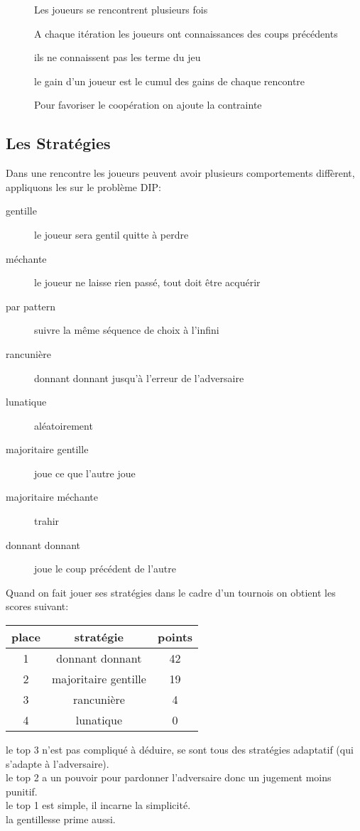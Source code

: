 \begin{description}
\item[] Les joueurs se rencontrent plusieurs fois
\item[] A chaque itération les joueurs ont connaissances des coups précédents 
\item[] ils ne connaissent pas les terme du jeu
\item[] le gain d'un joueur est le cumul des gains de chaque rencontre
\item[] Pour favoriser le coopération on ajoute la contrainte 
\end{description}

\subsection{Les Stratégies}

Dans une rencontre les joueurs peuvent avoir plusieurs comportements diffèrent, appliquons les sur le problème DIP:
\begin{description}
\item[gentille] le joueur sera gentil quitte à perdre
\item[méchante] le joueur ne laisse rien passé, tout doit être acquérir 
\item[par pattern] suivre la même séquence de choix à l'infini
\item[rancunière] donnant donnant jusqu'à l'erreur de l'adversaire
\item[lunatique] aléatoirement
\item[majoritaire gentille] joue ce que l'autre joue
\item[majoritaire méchante] trahir
\item[donnant donnant] joue le coup précédent de l'autre
\end{description}

Quand on fait jouer ses stratégies dans le cadre d'un tournois on obtient les scores suivant:

\begin{tabular}{c|cc}
place & stratégie & points \\
\hline
1 & donnant donnant & 42 \\
2 & majoritaire gentille & 19 \\
3 & rancunière & 4\\
4 & lunatique  & 0\\
\end{tabular}

le top 3 n'est pas compliqué à déduire, se sont tous des stratégies adaptatif (qui s'adapte à l'adversaire).\\
le top 2 a un pouvoir pour pardonner l'adversaire donc un jugement moins punitif.\\
le top 1 est simple, il incarne la simplicité.\\
la gentillesse prime aussi.\\

\pagebreak